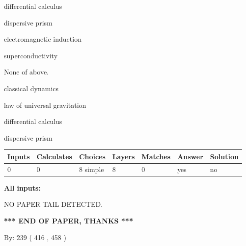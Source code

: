 \documentclass[12pt]{article}
\begin{document}
 
differential calculus
 
 
dispersive prism
 
 
electromagnetic induction
 
 
superconductivity
 
 
 None of above.
 
 
\noindent{}
 
 
classical dynamics
 
 
law of universal gravitation
 
 
differential calculus
 
 
dispersive prism
 
 
\noindent{}
 
 
   
   
   
   
\noindent\begin{tabular}{|l|l|l|l|l|l|l|}
 \hline
Inputs & Calculates & Choices & Layers & Matches & Answer & Solution \\ \hline
 0  & 
 0  & 
 8
  simple  
  & 
 8  & 
 0  & 
  yes & 
  no 
  \\ \hline
 \end{tabular}
   
   
   
   
\noindent{}
   
   
   
   
\noindent\vspace{0.1in}\hspace{-0.08in} {\textbf{\Large{All inputs: }}}
   
   
   
   
\vspace{2.0in} NO PAPER TAIL DETECTED.
   
   
   
   
\vspace{1.0in} 
{\textbf{\large{ *** END OF PAPER, THANKS *** }}} 
   
   
\hspace{1.0in} By: 
 239 ( 416 ,  458 )
   
\end{document}

